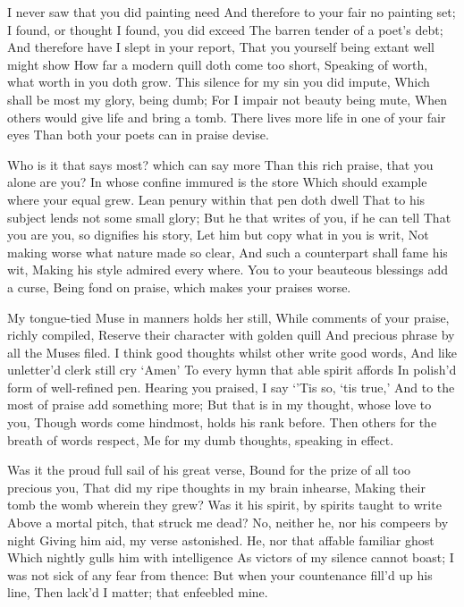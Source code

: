 \documentclass[twocolumn]{book}
\begin{document}
I never saw that you did painting need
And therefore to your fair no painting set;
I found, or thought I found, you did exceed
The barren tender of a poet's debt;
And therefore have I slept in your report,
That you yourself being extant well might show
How far a modern quill doth come too short,
Speaking of worth, what worth in you doth grow.
This silence for my sin you did impute,
Which shall be most my glory, being dumb;
For I impair not beauty being mute,
When others would give life and bring a tomb.
  There lives more life in one of your fair eyes
  Than both your poets can in praise devise.


Who is it that says most? which can say more
Than this rich praise, that you alone are you?
In whose confine immured is the store
Which should example where your equal grew.
Lean penury within that pen doth dwell
That to his subject lends not some small glory;
But he that writes of you, if he can tell
That you are you, so dignifies his story,
Let him but copy what in you is writ,
Not making worse what nature made so clear,
And such a counterpart shall fame his wit,
Making his style admired every where.
  You to your beauteous blessings add a curse,
  Being fond on praise, which makes your praises worse.


My tongue-tied Muse in manners holds her still,
While comments of your praise, richly compiled,
Reserve their character with golden quill
And precious phrase by all the Muses filed.
I think good thoughts whilst other write good words,
And like unletter'd clerk still cry `Amen'
To every hymn that able spirit affords
In polish'd form of well-refined pen.
Hearing you praised, I say `'Tis so, `tis true,'
And to the most of praise add something more;
But that is in my thought, whose love to you,
Though words come hindmost, holds his rank before.
  Then others for the breath of words respect,
  Me for my dumb thoughts, speaking in effect.


Was it the proud full sail of his great verse,
Bound for the prize of all too precious you,
That did my ripe thoughts in my brain inhearse,
Making their tomb the womb wherein they grew?
\numerus*{}Was it his spirit, by spirits taught to write
Above a mortal pitch, that struck me dead?
No, neither he, nor his compeers by night
Giving him aid, my verse astonished.
He, nor that affable familiar ghost
Which nightly gulls him with intelligence
As victors of my silence cannot boast;
I was not sick of any fear from thence:
  But when your countenance fill'd up his line,
  Then lack'd I matter; that enfeebled mine.
\end{document}
